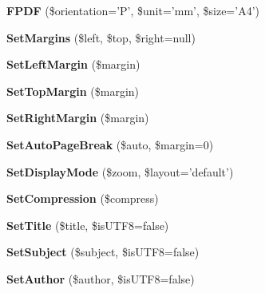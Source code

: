 \begin{DoxyCompactItemize}
\item 
\hypertarget{classFPDF_a38d6260bf42d1c581416bd5a23a3f850}{{\bfseries F\+P\+D\+F} (\$orientation='P', \$unit='mm', \$size='A4')}\label{classFPDF_a38d6260bf42d1c581416bd5a23a3f850}

\item 
\hypertarget{classFPDF_a03ee8480b6a0b9362820d225c309f603}{{\bfseries Set\+Margins} (\$left, \$top, \$right=null)}\label{classFPDF_a03ee8480b6a0b9362820d225c309f603}

\item 
\hypertarget{classFPDF_a64306dab17b5156dbb09151818ebf98b}{{\bfseries Set\+Left\+Margin} (\$margin)}\label{classFPDF_a64306dab17b5156dbb09151818ebf98b}

\item 
\hypertarget{classFPDF_aeb7511c3d686e2aa9f9496f1b1ec147f}{{\bfseries Set\+Top\+Margin} (\$margin)}\label{classFPDF_aeb7511c3d686e2aa9f9496f1b1ec147f}

\item 
\hypertarget{classFPDF_a1008ef2dbf448c60dd2f9324bcc6601a}{{\bfseries Set\+Right\+Margin} (\$margin)}\label{classFPDF_a1008ef2dbf448c60dd2f9324bcc6601a}

\item 
\hypertarget{classFPDF_a55c2e62a11e10dd7bc0c8aa089ba1c5e}{{\bfseries Set\+Auto\+Page\+Break} (\$auto, \$margin=0)}\label{classFPDF_a55c2e62a11e10dd7bc0c8aa089ba1c5e}

\item 
\hypertarget{classFPDF_aa0695aab6e2889198e94a48b87ddaae6}{{\bfseries Set\+Display\+Mode} (\$zoom, \$layout='default')}\label{classFPDF_aa0695aab6e2889198e94a48b87ddaae6}

\item 
\hypertarget{classFPDF_ab56cc065fff6c44c473c7f0428876486}{{\bfseries Set\+Compression} (\$compress)}\label{classFPDF_ab56cc065fff6c44c473c7f0428876486}

\item 
\hypertarget{classFPDF_a8a8a4c77944aae4ac0219fefbe53b494}{{\bfseries Set\+Title} (\$title, \$is\+U\+T\+F8=false)}\label{classFPDF_a8a8a4c77944aae4ac0219fefbe53b494}

\item 
\hypertarget{classFPDF_a29e614b472d76809a7f24d8382b2aec8}{{\bfseries Set\+Subject} (\$subject, \$is\+U\+T\+F8=false)}\label{classFPDF_a29e614b472d76809a7f24d8382b2aec8}

\item 
\hypertarget{classFPDF_a2448f729ffdee950dca638910a31a206}{{\bfseries Set\+Author} (\$author, \$is\+U\+T\+F8=false)}\label{classFPDF_a2448f729ffdee950dca638910a31a206}


\end{DoxyCompactItemize}
